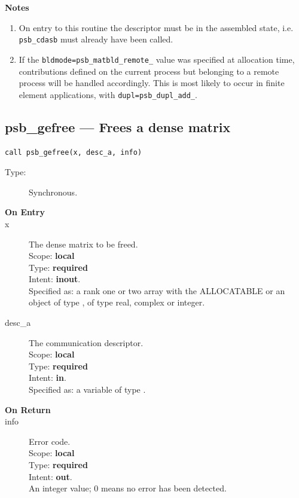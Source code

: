 {\par\noindent\large\bfseries Notes}
\begin{enumerate}
\item On entry to this routine the descriptor must  be in  the
  assembled state, i.e. \verb|psb_cdasb| must already have been called.
\item If the \verb|bldmode=psb_matbld_remote_| value was specified
  at allocation time, contributions defined on the current process but
  belonging to a remote process will be handled accordingly. This is
  most likely to occur in finite element applications, with
  \verb|dupl=psb_dupl_add_|.
\end{enumerate}


%

%
\clearpage\subsection{psb\_gefree --- Frees a dense matrix}

\begin{verbatim}
call psb_gefree(x, desc_a, info)
\end{verbatim}

\begin{description}
\item[Type:] Synchronous.
\item[\bf On Entry]
\item[x] The dense matrix to
  be freed.\\
Scope: {\bf local} \\
Type: {\bf required}\\
Intent: {\bf inout}.\\
Specified as: a rank one or two array with the ALLOCATABLE or an
object of type \vdata, of type real, complex or integer.\\

\item[desc\_a] The communication descriptor.\\
Scope: {\bf local} \\
Type: {\bf required}\\
Intent: {\bf in}.\\
Specified as: a variable of type \descdata.\\
\end{description}

\begin{description}
\item[\bf On Return]
\item[info] Error code.\\
Scope: {\bf local} \\
Type: {\bf required} \\
Intent: {\bf out}.\\
An integer value; 0 means no error has been detected. 
\end{description}


